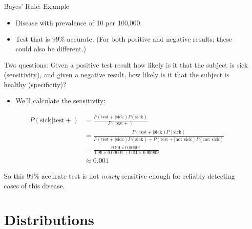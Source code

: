 \documentclass[
  ignorenonframetext,
]{beamer}
\providecommand{\tightlist}{%
  \setlength{\itemsep}{0pt}\setlength{\parskip}{0pt}}
\begin{document}
\begin{frame}{Bayes' Rule: Example}
\protect\hypertarget{bayes-rule-example}{}

\begin{itemize}
\tightlist
\item
  Disease with prevalence of 10 per 100,000.
\item
  Test that is 99\% accurate. (For both positive and negative results;
  these could also be different.)
\end{itemize}

Two questions: Given a positive test result how likely is it that the
subject is sick (sensitivity), and given a negative result, how likely
is it that the subject is healthy (specificity)?

\begin{itemize}
\tightlist
\item
  We'll calculate the sensitivity:
\end{itemize}

\scriptsize

\begin{align*}
P(\text{sick}|\text{test}+) & = \frac{P(\text{test}+|\text{sick})P(\text{sick})}{P(\text{test}+)} \\
      & = \frac{P(\text{test}+|\text{sick})P(\text{sick})}
      {P(\text{test}+|\text{sick})P(\text{sick})+P(\text{test}+|\text{not sick})P(\text{not sick})} \\
      & = \frac{0.99 \times 0.00001}{0.99 \times 0.00001 + 0.01 \times 0.99999}\\
      & \approx 0.001
\end{align*}

\normalsize

So this 99\% accurate test is not \emph{nearly} sensitive enough for
reliably detecting cases of this disease.

\end{frame}

\hypertarget{distributions}{%
\section{Distributions}\label{distributions}}
\end{document}
